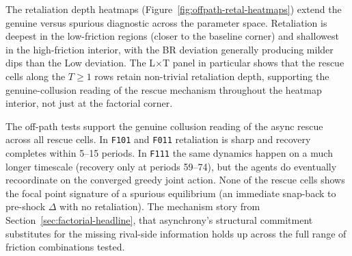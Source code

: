 The retaliation depth heatmaps (Figure~\ref{fig:offpath-retal-heatmaps}) extend the genuine versus spurious diagnostic across the parameter space. Retaliation is deepest in the low-friction regions (closer to the baseline corner) and shallowest in the high-friction interior, with the BR deviation generally producing milder dips than the Low deviation. The L$\times$T panel in particular shows that the rescue cells along the $T\geq 1$ rows retain non-trivial retaliation depth, supporting the genuine-collusion reading of the rescue mechanism throughout the heatmap interior, not just at the factorial corner.

The off-path tests support the genuine collusion reading of the async rescue across all rescue cells. In \texttt{F101} and \texttt{F011} retaliation is sharp and recovery completes within 5--15 periods. In \texttt{F111} the same dynamics happen on a much longer timescale (recovery only at periods 59--74), but the agents do eventually recoordinate on the converged greedy joint action. None of the rescue cells shows the focal point signature of a spurious equilibrium (an immediate snap-back to pre-shock $\Delta$ with no retaliation). The mechanism story from Section~\ref{sec:factorial-headline}, that asynchrony's structural commitment substitutes for the missing rival-side information holds up across the full range of friction combinations tested.
